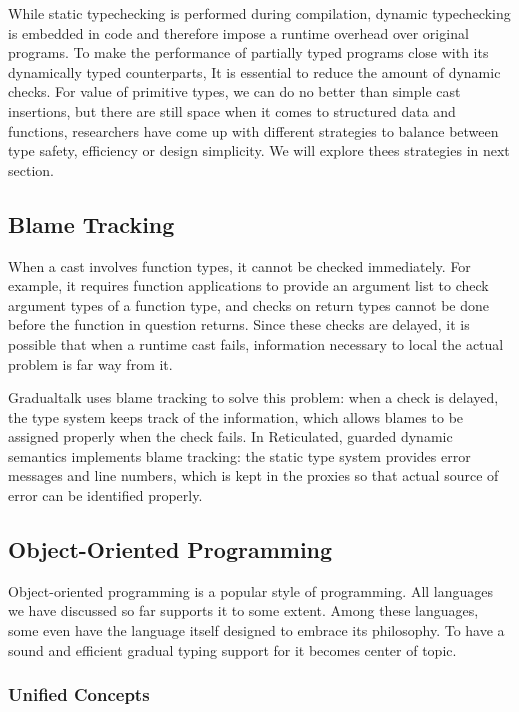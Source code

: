 While static typechecking is performed during compilation,
dynamic typechecking is embedded in code and therefore impose a runtime overhead over original programs.
To make the performance of partially typed programs close with its dynamically typed counterparts,
It is essential to reduce the amount of dynamic checks.
For value of primitive types, we can do no better than simple cast insertions,
but there are still space when it comes to structured data and functions,
researchers have come up with different strategies to balance between type safety, efficiency or design simplicity. We will explore thees strategies in next section.

\subsection{Blame Tracking}

When a cast involves function types, it cannot be checked immediately\cite{findler2002contracts,siek2009exploring}.
For example, it requires function applications to provide an argument list to check argument types
of a function type, and checks on return types cannot be done before the function in question
returns. Since these checks are delayed, it is possible that when a runtime cast fails,
information necessary to local the actual problem is far way from it.

Gradualtalk uses blame tracking\cite{wadler2009well} to solve this problem:
when a check is delayed, the type system keeps track of the information,
which allows blames to be assigned properly when the check fails.
In Reticulated, guarded dynamic semantics implements blame tracking:
the static type system provides error messages and line numbers,
which is kept in the proxies so that actual source of error can be identified properly.

\subsection{Object-Oriented Programming}

Object-oriented programming is a popular style of programming.
All languages we have discussed so far supports it to some extent.
Among these languages,
some even have the language itself designed to embrace its philosophy.
To have a sound and efficient gradual typing support for it
becomes center of topic.

\subsubsection{Unified Concepts}

